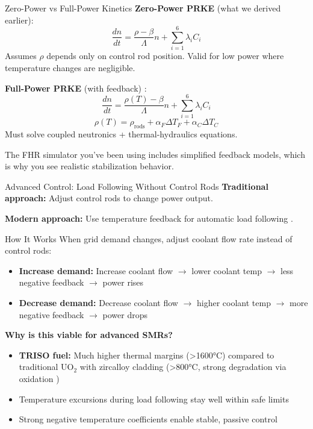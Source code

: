 \documentclass[aspectratio=169]{beamer}
\begin{document}
\begin{frame}[allowframebreaks]{Zero-Power vs Full-Power Kinetics}
    \textbf{Zero-Power PRKE} (what we derived earlier):
    $$ \frac{dn}{dt} = \frac{\rho - \beta}{\Lambda}n + \sum_{i=1}^{6} \lambda_i C_i $$
    Assumes $\rho$ depends only on control rod position. Valid for low power where temperature changes are negligible.

    \vspace{1em}
    \textbf{Full-Power PRKE} (with feedback) \cite{bell1970nuclear}:
    $$ \frac{dn}{dt} = \frac{\rho(T) - \beta}{\Lambda}n + \sum_{i=1}^{6} \lambda_i C_i $$
    $$ \rho(T) = \rho_{\text{rods}} + \alpha_F \Delta T_F + \alpha_C \Delta T_C $$
    Must solve coupled neutronics + thermal-hydraulics equations.

    \vspace{1em}
    The FHR simulator you've been using includes simplified feedback models, which is why you see realistic stabilization behavior.
\end{frame}

\begin{frame}[allowframebreaks]{Advanced Control: Load Following Without Control Rods}
    \textbf{Traditional approach:} Adjust control rods to change power output.

    \vspace{1em}
    \textbf{Modern approach:} Use temperature feedback for automatic load following \cite{zhang2024load}.

    \vspace{1em}
    \begin{block}{How It Works}
        When grid demand changes, adjust coolant flow rate instead of control rods:
        \begin{itemize}
            \item \textbf{Increase demand:} Increase coolant flow $\rightarrow$ lower coolant temp $\rightarrow$ less negative feedback $\rightarrow$ power rises
            \item \textbf{Decrease demand:} Decrease coolant flow $\rightarrow$ higher coolant temp $\rightarrow$ more negative feedback $\rightarrow$ power drops
        \end{itemize}
    \end{block}

    \vspace{1em}
    \textbf{Why is this viable for advanced SMRs?}
    \begin{itemize}
        \item \textbf{TRISO fuel:} Much higher thermal margins (\textgreater 1600°C) compared to traditional UO$_2$ 
			with zircalloy cladding (\textgreater 800°C, strong degradation via oxidation
			\cite{duriez2019zircaloy})
        \item Temperature excursions during load following stay well within safe limits
        \item Strong negative temperature coefficients enable stable, passive control
    \end{itemize}
\end{frame}
\end{document}
